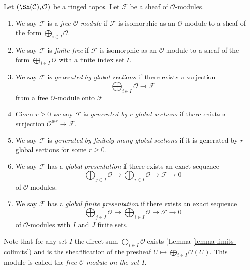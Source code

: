 \begin{definition}
\label{definition-global}
Let $(\Sh(\mathcal{C}), \mathcal{O})$ be a ringed topos.
Let $\mathcal{F}$ be a sheaf of $\mathcal{O}$-modules.
\begin{enumerate}
\item We say $\mathcal{F}$ is a {\it free $\mathcal{O}$-module}
if $\mathcal{F}$ is isomorphic as an $\mathcal{O}$-module
to a sheaf of the form $\bigoplus_{i \in I} \mathcal{O}$.
\item We say $\mathcal{F}$ is {\it finite free} if
$\mathcal{F}$ is isomorphic as an $\mathcal{O}$-module
to a sheaf of the form $\bigoplus_{i \in I} \mathcal{O}$
with a finite index set $I$.
\item We say $\mathcal{F}$ is {\it generated by global sections}
if there exists a surjection
$$
\bigoplus\nolimits_{i \in I} \mathcal{O} \longrightarrow \mathcal{F}
$$
from a free $\mathcal{O}$-module onto $\mathcal{F}$.
\item Given $r \geq 0$ we say $\mathcal{F}$ is
{\it generated by $r$ global sections} if there exists a surjection
$\mathcal{O}^{\oplus r} \to \mathcal{F}$.
\item We say $\mathcal{F}$ is {\it generated by finitely many global sections}
if it is generated by $r$ global sections for some $r \geq 0$.
\item We say $\mathcal{F}$ has a {\it global presentation}
if there exists an exact sequence
$$
\bigoplus\nolimits_{j \in J} \mathcal{O} \longrightarrow
\bigoplus\nolimits_{i \in I} \mathcal{O} \longrightarrow
\mathcal{F} \longrightarrow 0
$$
of $\mathcal{O}$-modules.
\item We say $\mathcal{F}$ has a {\it global finite presentation}
if there exists an exact sequence
$$
\bigoplus\nolimits_{j \in J} \mathcal{O} \longrightarrow
\bigoplus\nolimits_{i \in I} \mathcal{O} \longrightarrow
\mathcal{F} \longrightarrow 0
$$
of $\mathcal{O}$-modules with $I$ and $J$ finite sets.
\end{enumerate}
\end{definition}

\noindent
Note that for any set $I$ the direct sum
$\bigoplus_{i \in I} \mathcal{O}$ exists
(Lemma \ref{lemma-limits-colimits})
and is the sheafification of the presheaf
$U \mapsto \bigoplus_{i \in I} \mathcal{O}(U)$.
This module is called the {\it free $\mathcal{O}$-module on the set $I$}.

